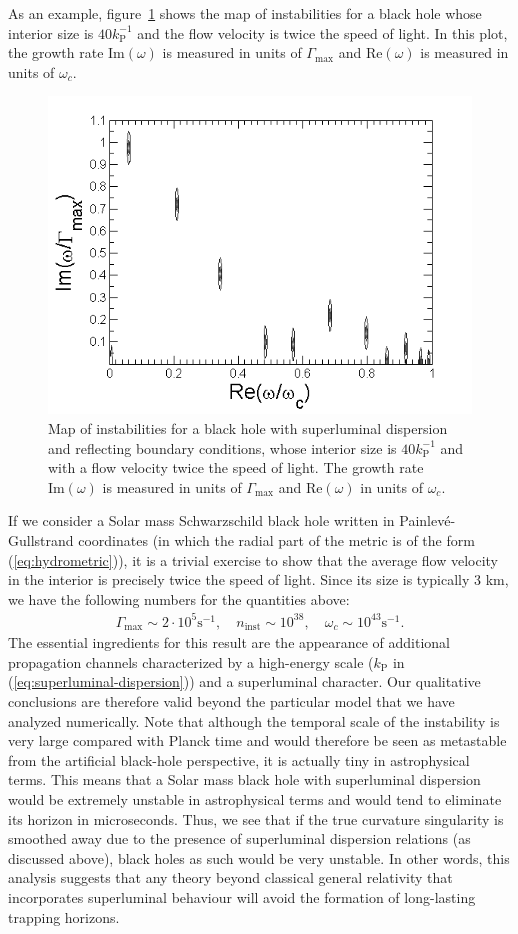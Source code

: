 \documentclass[11pt,a4paper]{article}
\begin{document}
As an example,
figure~\ref{fig:refl-v2-l40} shows the map of instabilities for a black hole
whose interior size is $40 k_\text{P}^{-1}$ and the flow velocity is twice the speed of
light. In this plot, the growth rate $\text{Im}(\omega)$ is measured in units of
$\Gamma_\text{max}$ and $\text{Re}(\omega)$ is measured in units of $\omega_c$.
%

\begin{figure}
\begin{center}
\includegraphics[width=0.6\columnwidth]{refl-v2-l40}
  \caption{Map of instabilities for a black hole with superluminal dispersion and 
reflecting boundary conditions, whose interior size is $40 k_\text{P}^{-1}$ and with a flow velocity
twice the speed of light. The growth rate $\text{Im}(\omega)$ is measured in units of
$\Gamma_\text{max}$ and $\text{Re}(\omega)$  in units of $\omega_c$.
}\label{fig:refl-v2-l40}
\end{center}
 \end{figure}
% 
If we consider a Solar mass Schwarzschild black hole written in
Painlev\'e-Gullstrand coordinates (in which the radial part of the metric is of
the form (\ref{eq:hydrometric})), it is a trivial exercise to show that the average flow velocity in the interior is
precisely twice the speed of light. Since its size is typically 3 km, we have
the following numbers for the quantities above:
 \begin{align}
 \Gamma_\text{max} \sim 2 \cdot 10^5 \text{s}^{-1},\quad
 n_\text{inst}\sim 10^{38},\quad
 \omega_c\sim 10^{43} \text{s}^{-1}.
 \end{align}
%
The essential ingredients for this result are the appearance of additional propagation channels characterized by a high-energy scale ($k_\text{P}$ in (\ref{eq:superluminal-dispersion})) and a superluminal character. Our qualitative conclusions are therefore valid beyond the particular model that we have analyzed numerically. Note that although the temporal scale of the instability is very large compared with Planck time and  would therefore be seen as metastable from the artificial black-hole perspective,  it is actually tiny in astrophysical terms. This means that a Solar mass black hole with superluminal dispersion would be extremely unstable in astrophysical terms and would tend to eliminate its horizon in  microseconds.  Thus, we see that if the true curvature singularity is smoothed away due to the presence of superluminal dispersion relations (as discussed above), black
holes as such would be very unstable. In other words, this analysis suggests that any theory beyond classical general relativity that incorporates superluminal behaviour will avoid the formation of
long-lasting trapping horizons.  
\end{document}
